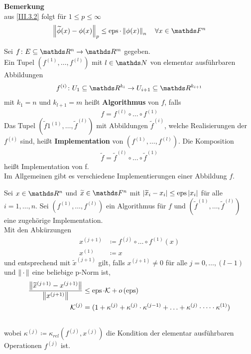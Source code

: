 \textbf{Bemerkung}\\
aus \eqref{III.3.2} folgt für $1\leq p\leq \infty$
\begin{gather}
  \nn{\widetilde{\phi}(x)-\phi(x)}_p \leq \Eps\cdot\nn{\phi(x)}_n 
  \quad \forall x\in\F^n \label{III.3.3}
\end{gather}


\begin{Defe}
  Sei $f\colon E\subseteq \Ren \to \R^m$ gegeben.\\
  Ein Tupel $\left(f^{(1)},\ldots ,f^{(l)}\right)$ mit $l\in \N$ von elementar ausführbaren
  Abbildungen
  \begin{gather*}
    f^{(i)}\colon U_1\subseteq \R^{k_i} \to U_{i+1}\subseteq \R^{k_{i+1}}
  \end{gather*}
  mit $k_1=n$ und $k_{l+1}=m$ heißt \textbf{Algorithmus} von $f$, falls
  \begin{gather*}
    f=f	^{(l)}\circ \dotsc \circ f^{(1)}
  \end{gather*}
  Das Tupel $(\widetilde{f}1^{(1)},\ldots ,\widetilde{f}^{(l)})$ mit Abbildungen $\widetilde{f}^{(i)}$, welche Realisierungen der $f^{(i)}$ sind,
  heißt \textbf{Implementation} von 
  $\left(f^{(1)},\dotsc ,f^{(l)}\right)$.
  Die Komposition 
  \begin{gather*}
    \widetilde{f}=\widetilde{f}	^{(l)}\circ \dotsc \circ \widetilde{f}^{(1)}
  \end{gather*}
  heißt Implementation von f. \\
  Im Allgemeinen gibt es verschiedene Implementierungen einer Abbildung $f$.
\end{Defe}


\begin{Leme}[Fehlerfortpflanzung]
  \label{3.3.5} 
  Sei $x\in \Ren$ und $\widetilde{x}\in \F^n$ mit $|\widetilde{x}_i-x_i|\leq \operatorname{eps}|x_i|$ für alle 
  $i=1,\ldots , n$.
  Sei $\left(f^{(1)},\dotsc ,f^{(l)}\right)$ ein Algorithmus für $f$ und 
  $(\widetilde{f}^{(1)},\dotsc ,\widetilde{f}^{(l)})$ eine zugehörige Implementation. \\
  Mit den Abkürzungen
  \begin{align*}
    x^{(j+1)} &\coloneqq f^{(j)}\circ \dotsc \circ f^{(1)}(x) \\
    x^{(1)} &\coloneqq x
  \end{align*}
  und entsprechend mit $\widetilde{x}^{(j+1)}$ gilt,
  falls $x^{(j+1)} \neq 0$ für alle $j=0,\dotsc , (l-1)$ und $\left\| \,\cdot\, \right\|$ eine beliebige p-Norm ist,
  \begin{align}
    \frac{\left\| \widetilde{x}^{(j+1)}-x^{(j+1)} \right\|}{\left\| x^{(j+1)} \right\|}
    &\leq \operatorname{eps} \cdot \mathcal{K} + o\left(\operatorname{eps}\right)
      \label{III.3.4} 
    \\ \nonumber
    \mathcal{K}^{(j)}&=(1+\kappa^{(j)}+\kappa^{(j)}\cdot \kappa^{(j-1)}+ \ldots + \kappa^{(j)}\cdot \dotsm \cdot \kappa^{(1)}) \\ \nonumber
  \end{align}
  wobei $	\kappa^{(j)} \coloneqq \kappa_{rel}(f^{(j)}, x^{(j)})$ die Kondition der elementar ausführbaren Operationen $f^{(j)}$ ist.
\end{Leme}

